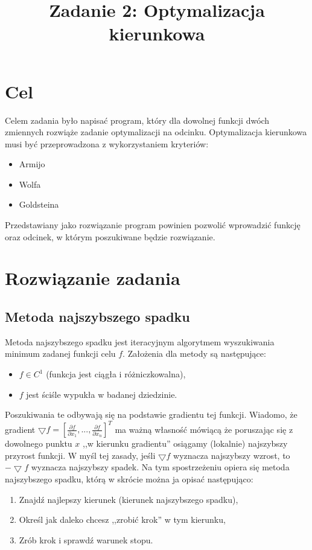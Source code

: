 \documentclass{classrep}
\author{
  \studentinfo{Paweł Musiał}{178726} \and
  \studentinfo{Łukasz Michalski}{178724}
}
\title{Zadanie 2: Optymalizacja kierunkowa}
\begin{document}
\maketitle

\addtocounter{footnote}{1}

\section{Cel}
Celem zadania było napisać program, który dla dowolnej funkcji dwóch zmiennych rozwiąże zadanie optymalizacji na odcinku. Optymalizacja kierunkowa musi być przeprowadzona z wykorzystaniem kryteriów:
\begin{itemize}
\item Armijo
\item Wolfa
\item Goldsteina
\end{itemize}
Przedstawiany jako rozwiązanie program powinien pozwolić wprowadzić funkcję oraz odcinek, w którym poszukiwane będzie rozwiązanie.

\section{Rozwiązanie zadania}
\subsection{Metoda najszybszego spadku}
Metoda najszybszego spadku jest iteracyjnym algorytmem wyszukiwania minimum zadanej funkcji celu $f$. Założenia dla metody są następujące:
\begin{itemize}
\item $f\in C^1$ (funkcja jest ciągła i różniczkowalna),
\item $f$ jest ściśle wypukła w badanej dziedzinie.
\end{itemize}
Poszukiwania te odbywają się na podstawie gradientu tej funkcji. Wiadomo, że gradient $\bigtriangledown f=[\frac{\partial f}{\partial x_{1}},...,\frac{\partial f}{\partial x_{n}}]^T$ ma ważną własność mówiącą że poruszając się z dowolnego punktu $x$ ,,w kierunku gradientu'' osiągamy (lokalnie) najszybszy przyrost funkcji. W myśl tej zasady, jeśli $\bigtriangledown f$ wyznacza najszybszy wzrost, to $-\bigtriangledown f$ wyznacza najszybszy spadek. Na tym spostrzeżeniu opiera się metoda najszybszego spadku, którą w skrócie można ja opisać następująco:
\begin{enumerate}
\item Znajdź najlepszy kierunek (kierunek najszybszego spadku),
\item Określ jak daleko chcesz ,,zrobić krok'' w tym kierunku,
\item Zrób krok i sprawdź warunek stopu.
\end{enumerate}
\end{document}
